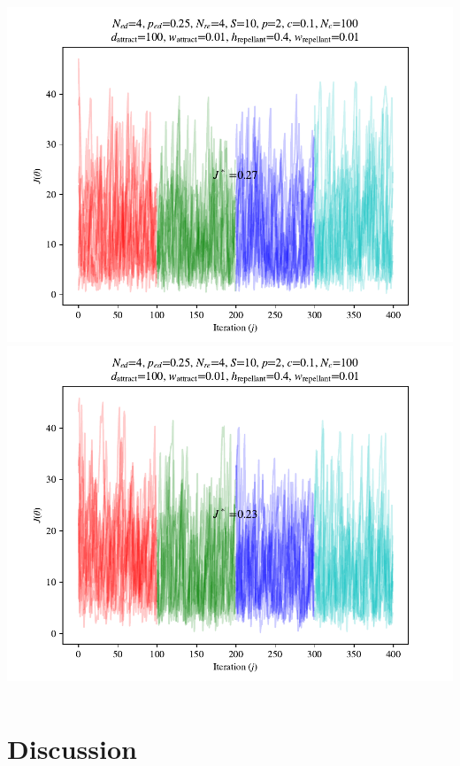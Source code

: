 \documentclass{beamer}
\begin{document}
\begin{frame}
\begin{columns}[T]
\begin{center}
    \includegraphics[scale=0.3]{assets/rastrigin_colony_ed_2_J}
    \includegraphics[scale=0.3]{assets/rastrigin_colony_ed_3_J}
  \end{center}
\end{columns}
\end{frame}

\section{Discussion}
\end{document}
